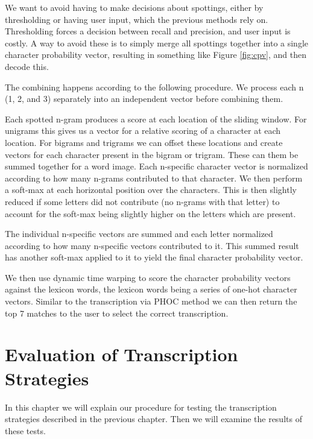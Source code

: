 \documentclass[ms,electronic,twosidetoc,letterpaper,chaptercenter,parttop,lof,lot]{byumsphd}
\begin{document}
We want to avoid having to make decisions about spottings, either by thresholding or having user input, which the previous methods rely on. Thresholding forces a decision between recall and precision, and user input is costly. A way to avoid these is to simply merge all spottings together into a single character probability vector, resulting in something like Figure \ref{fig:cpv}, and then decode this.



The combining happens according to the following procedure.
We process each n (1, 2, and 3) separately into an independent vector before combining them.

Each spotted n-gram produces a score at each location of the sliding window. For unigrams this gives us a vector for a relative scoring of a character at each location. For bigrams and trigrams we can offset these locations and create vectors for each character present in the bigram or trigram. These can them be summed together for a word image.
Each n-specific character vector is normalized according to how many n-grams contributed to that character.
We then perform a soft-max at each horizontal position over the characters. This is then slightly reduced if some letters did not contribute (no n-grams with that letter) to account for the soft-max being slightly higher on the letters which are present.

The individual n-specific vectors are summed and each letter normalized according to how many n-specific vectors contributed to it.
This summed result has another soft-max applied to it to yield the final character probability vector.

We then use dynamic time warping to score the character probability vectors against the lexicon words, the lexicon words being a series of one-hot character vectors. Similar to the transcription via PHOC method we can then return the top 7 matches to the user to select the correct transcription.




\chapter{Evaluation of Transcription Strategies}

In this chapter we will explain our procedure for testing the transcription strategies described in the previous chapter. Then we will examine the results of these tests.
\end{document}

